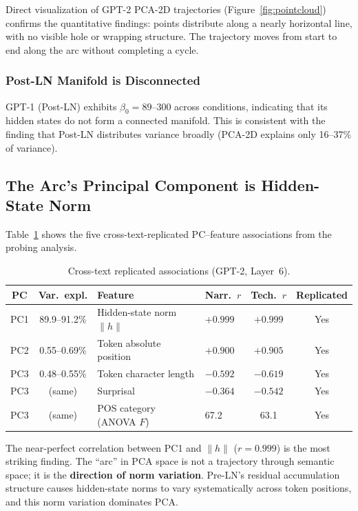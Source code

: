 \documentclass[11pt,a4paper]{article}
\begin{document}
Direct visualization of GPT-2 PCA-2D trajectories (Figure~\ref{fig:pointcloud}) confirms the quantitative findings: points distribute along a nearly horizontal line, with no visible hole or wrapping structure. The trajectory moves from start to end along the arc without completing a cycle.

\subsubsection{Post-LN Manifold is Disconnected}

GPT-1 (Post-LN) exhibits $\beta_0 = 89$--$300$ across conditions, indicating that its hidden states do not form a connected manifold. This is consistent with the finding that Post-LN distributes variance broadly (PCA-2D explains only 16--37\% of variance).

\subsection{The Arc's Principal Component is Hidden-State Norm}

Table~\ref{tab:probing} shows the five cross-text-replicated PC--feature associations from the probing analysis.

\begin{table}[h]
\centering
\caption{Cross-text replicated associations (GPT-2, Layer~6).}
\label{tab:probing}
\begin{tabular}{ccllcc}
\toprule
PC & Var.\ expl. & Feature & Narr.\ $r$ & Tech.\ $r$ & Replicated \\
\midrule
PC1 & 89.9--91.2\% & Hidden-state norm $\|h\|$ & $+0.999$ & $+0.999$ & Yes \\
PC2 & 0.55--0.69\% & Token absolute position  & $+0.900$ & $+0.905$ & Yes \\
PC3 & 0.48--0.55\% & Token character length    & $-0.592$ & $-0.619$ & Yes \\
PC3 & (same)       & Surprisal                & $-0.364$ & $-0.542$ & Yes \\
PC3 & (same)       & POS category (ANOVA $F$) & 67.2     & 63.1     & Yes \\
\bottomrule
\end{tabular}
\end{table}

The near-perfect correlation between PC1 and $\|h\|$ ($r = 0.999$) is the most striking finding. The ``arc'' in PCA space is not a trajectory through semantic space; it is the \textbf{direction of norm variation}. Pre-LN's residual accumulation structure causes hidden-state norms to vary systematically across token positions, and this norm variation dominates PCA.
\end{document}
